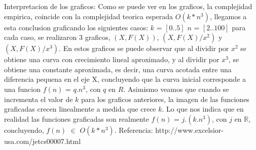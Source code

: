 Interpretacion de los graficos: Como se puede ver en los graficos, la complejidad empirica, coincide con la complejidad teorica esperada $O(k*n^3)$, llegamos a esta conclusion graficando los siguientes casos: $k$ = $[0..5]$ $n$ = $[2..100]$ para cada caso, se realizaron 3 graficos, $(X,F(X))$,  $(X,F(X)/x^2)$ y $(X,F(X)/x^3)$. En estos graficos se puede observar que al dividir por $x^2$ se obtiene una curva con crecimiento lineal aproximado, y al dividir por $x^3$, se obtiene una constante aproximada, es decir, una curva acotada entre una diferencia pequena en el eje X, concluyendo que la curva inicial corresponde a una funcion $f(n)$ = $q.n^3$, con $q$ en $R$. Asimismo veamos que cuando se incrementa el valor de $k$ para los graficos anteriores, la imagen de las funciones graficadas crecen linealmente a medida que crece $k$. Lo que nos indica que en realidad las funciones graficadas son realmente $f(n)$ = $j.(k.n^3)$, con $j$ en $\mathbb{R}$, concluyendo, $f(n)$ $\in$ $O(k*n^3)$. Referencia: http://www.excelsior-usa.com/jetcs00007.html

